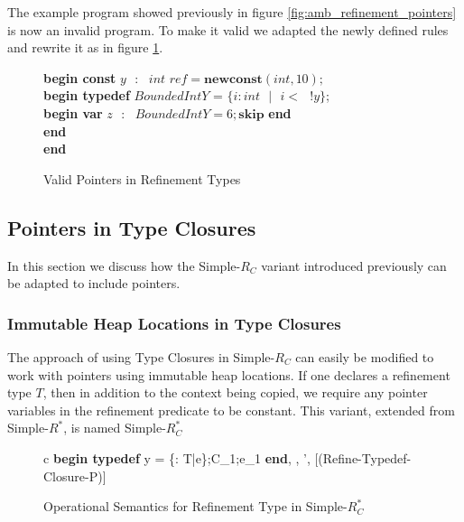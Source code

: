 \documentclass[a4paper,12pt]{report}
\newenvironment{tabs}[1]
 {\flushleft\TabPositions{#1}}
 {\endflushleft}
\begin{document}
\par
The example program showed previously in figure \ref{fig:amb_refinement_pointers} 
is now an invalid program. To make it valid we adapted the newly defined rules 
and rewrite it as in figure \ref{fig:valid_ptr_program}.

\begin{figure} [H]
  \begin{tabs}{1cm,2cm}
    \textbf{begin const }$y\text{ }:\text{ } int\textit{ ref} = \textbf{newconst}(int, 10);$\\
    \tab\textbf{begin typedef }$BoundedIntY$ = $\{i : int\text{ }|\text{ }i <\text{ }!y\}$; \\ 
    \tab\tab\textbf{begin var }$z\text{ }:\text{ }BoundedIntY = 6;\textbf{skip}$\textbf { end} \\
    \tab\textbf {end} \\
    \textbf{end}
  \end{tabs}  
  \caption{Valid Pointers in Refinement Types}
  \label{fig:valid_ptr_program}
\end{figure}


\subsection{Pointers in Type Closures}
In this section we discuss how the Simple-$R_{C}$ variant introduced previously 
can be adapted to include pointers. 

\subsubsection{Immutable Heap Locations in Type Closures}
The approach of using Type Closures in Simple-$R_{C}$ 
can easily be modified to work with pointers using immutable heap locations. 
If one declares a refinement type $T$, then in addition to 
the context being copied, we require any pointer variables in the refinement 
predicate to be constant. This variant, extended from Simple-$R^{*}$, is 
named Simple-$R^{*}_{C}$

\begin{figure}[H]
  \begin{center}
    \begin{tabular} {c}      
      {\langle\textbf{begin typedef } y = \{\upsilon : T\text{ }|\text{ }e\};C_1;e_1\textbf{ end}, 
      \sigma, \tau \rangle \longrightarrow \langle \sigma', \tau \rangle} [(Refine-Typedef-Closure-P)]
    \end{tabular}
  \end{center}
  \caption{Operational Semantics for Refinement Type in Simple-$R^{*}_{C}$}
\end{figure}
\end{document}
